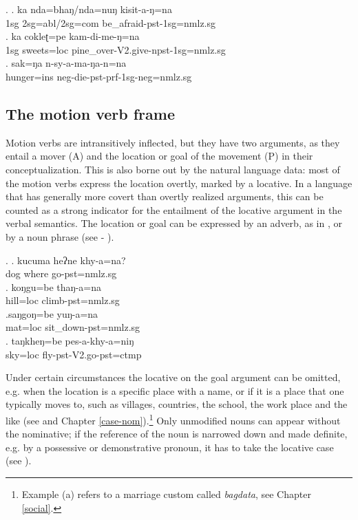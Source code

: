 \ex. \ag.  ka nda=bhaŋ/nda=nuŋ kisit-a-ŋ=na\\
	{\sc 1sg} {\sc 2sg=abl/2sg=com} be\_afraid-{\sc pst-1sg=nmlz.sg}\\
\bg. ka cokleʈ=pe kam-di-me-ŋ=na\\
	{\sc 1sg} sweets{\sc =loc} pine\_over-{\sc V2.give-npst-1sg=nmlz.sg}\\
\bg. sak=ŋa n-sy-a-ma-ŋa-n=na\\
			hunger{\sc =ins} {\sc neg-}die{\sc -pst-prf-1sg-neg=nmlz.sg}\\
				
\subsection{The motion verb frame}\label{itr-motion}
 
\noindent 
Motion verbs are intransitively inflected, but they have two arguments, as they entail a mover (A) and the location or goal of the movement (P) in their conceptualization. This is also borne out by the natural language data: most of the motion verbs express the location overtly, marked by a locative. In a language that has generally more covert than overtly realized arguments, this can be counted as a strong indicator for the entailment of the locative argument in the verbal semantics. The location or goal can be expressed by an adverb, as in \Next[a], or by a noun phrase (see \Next[b] - \Next[d]). 

\ex. \ag. kucuma heʔne khy-a=na?\\
		dog where go{\sc [3sg]-pst=nmlz.sg} 	\\
	\bg. koŋgu=be thaŋ-a=na\\
		hill{\sc =loc} climb{\sc [3sg]-pst=nmlz.sg}\\
	\bg.saŋgoŋ=be yuŋ-a=na\\
	 mat{\sc =loc} sit\_down{\sc [3sg]-pst=nmlz.sg}\\
	\bg.  taŋkheŋ=be  pes-a-khy-a=niŋ\\
	 sky{\sc =loc} fly{\sc [3sg]-pst-V2.go-pst=ctmp}		\\
	 	


Under certain circumstances the locative on the goal argument can be omitted, e.g. when the location is a specific place with a name, or if it is a place that one typically moves to, such as villages, countries, the school, the work place and the like (see \Next and Chapter \ref{case-nom}).\footnote{Example (a) refers to a marriage custom called \emph{bagdata}, see Chapter \ref{social}.}  Only unmodified nouns can appear without the nominative; if the reference of the noun is narrowed down and made definite, e.g. by a possessive or demonstrative pronoun, it has to take the locative case (see \Next[c]).   

